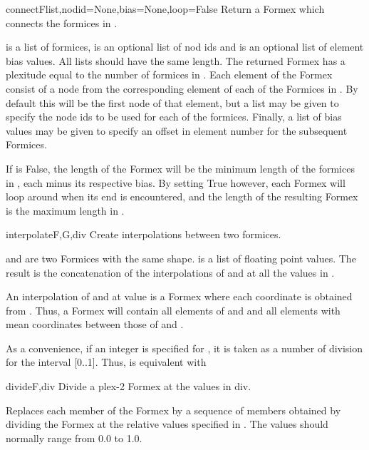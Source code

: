 {{\begin{funcdesc}{connect}{Flist,nodid=None,bias=None,loop=False}
Return a Formex which connects the formices in .

 is a list of formices,  is an optional list of nod ids and  is an optional list of element bias values. All lists should have the same length. The returned Formex has a plexitude equal to the number of formices in . Each element of the Formex consist of a node from the corresponding element of each of the Formices in . By default this will be the first node of that element, but a  list may be given to specify the node ids to be used for each of the formices. Finally, a list of bias values may be given to specify an offset in element number for the subsequent Formices.

If  is False, the length of the Formex will be the minimum length of the formices in , each minus its respective bias. By setting  True however, each Formex will loop around when its end is encountered, and the length of the resulting Formex is the maximum length in .
\end{funcdesc}


\begin{funcdesc}{interpolate}{F,G,div}
Create interpolations between two formices.

 and  are two Formices with the same shape.
 is a list of floating point values.
The result is the concatenation of the interpolations of  and  at all the values in .

An interpolation of  and  at value  is a Formex  where each coordinate  is obtained from  .
Thus, a Formex  will contain all elements
of  and  and all elements with mean coordinates between those of  and .

As a convenience, if an integer is specified for , it is taken as a
number of division for the interval [0..1].
Thus,  is equivalent with
\end{funcdesc}


\begin{funcdesc}{divide}{F,div}
Divide a plex-2 Formex at the values in div.

Replaces each member of the Formex  by a sequence of members obtained
by dividing the Formex at the relative values specified in . The values
should normally range from 0.0 to 1.0.
    

\end{funcdesc}}}
